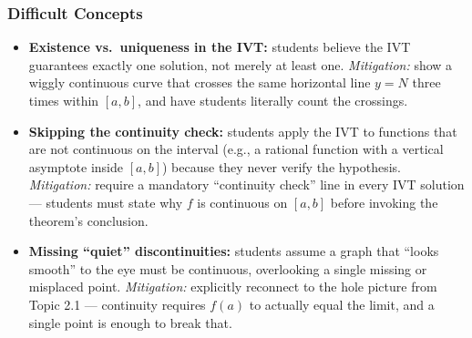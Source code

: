 \documentclass[11pt]{article}
\begin{document}
\subsubsection*{Difficult Concepts}
\begin{itemize}[leftmargin=*]
  \item \textbf{Existence vs.\ uniqueness in the IVT:} students believe the IVT guarantees exactly one solution, not merely at least one. \textit{Mitigation:} show a wiggly continuous curve that crosses the same horizontal line $y=N$ three times within $[a,b]$, and have students literally count the crossings.
  \item \textbf{Skipping the continuity check:} students apply the IVT to functions that are not continuous on the interval (e.g., a rational function with a vertical asymptote inside $[a,b]$) because they never verify the hypothesis. \textit{Mitigation:} require a mandatory ``continuity check'' line in every IVT solution --- students must state why $f$ is continuous on $[a,b]$ before invoking the theorem's conclusion.
  \item \textbf{Missing ``quiet'' discontinuities:} students assume a graph that ``looks smooth'' to the eye must be continuous, overlooking a single missing or misplaced point. \textit{Mitigation:} explicitly reconnect to the hole picture from Topic 2.1 --- continuity requires $f(a)$ to actually equal the limit, and a single point is enough to break that.
\end{itemize}
\end{document}
